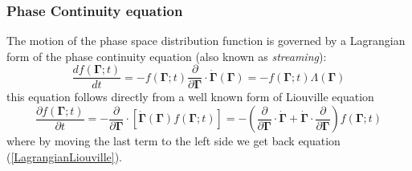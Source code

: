 \documentclass[a4paper,12pt]{article}
\begin{document}
\subsubsection{Phase Continuity equation}



The motion of the phase space distribution function is governed by a Lagrangian form of the phase continuity equation (also known as \textit{streaming}):
\begin{equation}
\label{LagrangianLiouville}
  \frac{df(\bm{\Gamma};t)}{dt}=-f(\bm{\Gamma};t)\frac{\partial}{\partial \bm{\Gamma}} \cdot \dot{\bm{\Gamma}}(\bm{\Gamma}) = -f(\bm{\Gamma};t)\Lambda(\bm{\Gamma})
\end{equation}
this equation follows directly from a well known form of Liouville equation
\begin{equation}
    \frac{\partial f(\bm{\Gamma};t) }{\partial t}
    = -\frac{\partial}{\partial \bm{\Gamma}} \cdot [\dot{\bm{\Gamma}}(\bm{\Gamma}) f(\bm{\Gamma};t)]
     = -(\frac{\partial}{\partial \bm{\Gamma}} \cdot \dot{\bm{\Gamma}} + \dot{\bm{\Gamma}} \cdot \frac{\partial}{\partial \bm{\Gamma}}) f(\bm{\Gamma};t)
\end{equation}
where by moving the last term to the left side we get back equation (\ref{LagrangianLiouville}).

\end{document}
